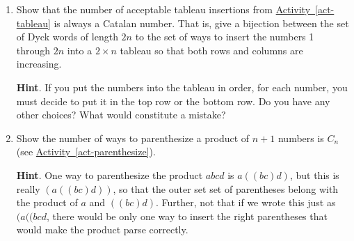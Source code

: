 \documentclass{book}
\begin{document}
\setcounter{cpjt}{179}
\addtocounter{cpjt}{-1}
\begin{activity}\label{activity-172}
\leavevmode%
\begin{enumerate}[font=\bfseries,label=(\alph*),ref=\alph*]
\item\label{task-187} \hypertarget{p-1012}{}%
Show that the number of acceptable tableau insertions from \hyperref[act-tableau]{Activity~\ref{act-tableau}} is always a Catalan number.  That is, give a bijection between the set of Dyck words of length \(2n\) to the set of ways to insert the numbers 1 through \(2n\) into a \(2\times n\) tableau so that both rows and columns are increasing.%
\par\smallskip%
\noindent\textbf{Hint}.\hypertarget{hint-118}{}\quad%
\hypertarget{p-1013}{}%
If you put the numbers into the tableau in order, for each number, you must decide to put it in the top row or the bottom row.  Do you have any other choices?  What would constitute a mistake?%
\item\label{task-188} \hypertarget{p-1014}{}%
Show the number of ways to parenthesize a product of \(n+1\) numbers is \(C_n\) (see \hyperref[act-parenthesize]{Activity~\ref{act-parenthesize}}).%
\par\smallskip%
\noindent\textbf{Hint}.\hypertarget{hint-119}{}\quad%
\hypertarget{p-1015}{}%
One way to parenthesize the product \(abcd\) is \(a((bc)d)\), but this is really \((a((bc)d))\), so that the outer set set of parentheses belong with the product of \(a\) and \(((bc)d)\).  Further, not that if we wrote this just as \((a((bcd\), there would be only one way to insert the right parentheses that would make the product parse correctly.%
\end{enumerate}
\end{activity}

\clearpage
\end{document}
